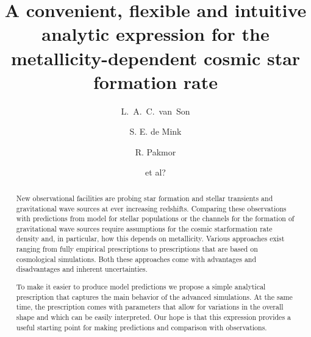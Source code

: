 \documentclass[twocolumn]{aastex631}
\begin{document}
\title{ A convenient, flexible and intuitive analytic expression for the metallicity-dependent cosmic star formation rate  }



\author[0000-0001-5484-4987]{L.~A.~C.~van~Son}

 \author[0000-0001-9336-2825]{S. E. de Mink}

 \author[0000-0003-3308-2420]{R. Pakmor}

\author{et al?}

\begin{abstract}
New observational facilities are probing star formation and stellar transients and gravitational wave sources at ever increasing redshifts. Comparing these observations with predictions from model for stellar populations or the channels for the formation of gravitational wave sources require assumptions for the cosmic starformation rate density and, in particular, how this depends on metallicity.  Various approaches exist ranging from fully empirical prescriptions to prescriptions that are based on cosmological simulations. Both these approaches come with advantages and disadvantages and inherent uncertainties. 

To make it easier to produce model predictions we propose a simple analytical prescription that captures the main behavior of the advanced simulations. At the same time, the prescription comes with parameters that allow for variations in the overall shape and which can be easily interpreted. Our hope is that this expression provides a useful starting point for making predictions and comparison with observations. 
\end{abstract}
\end{document}
